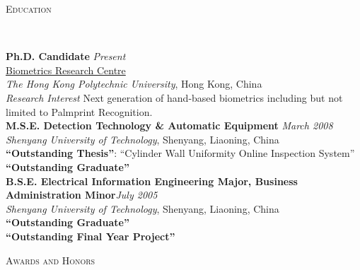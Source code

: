 \documentclass[9pt]{article}
\newenvironment{changemargin}[2]{%
  \begin{list}{}{%
    \setlength{\topsep}{0pt}%
    \setlength{\leftmargin}{#1}%
    \setlength{\rightmargin}{#2}%
    \setlength{\listparindent}{\parindent}%
    \setlength{\itemindent}{\parindent}%
    \setlength{\parsep}{\parskip}%
  }%
  \item[]}{\end{list}
}
\newcommand{\lineover}{
	\begin{changemargin}{-0.05in}{-0.05in}
		\vspace*{-8pt}
		\hrulefill \\
		\vspace*{-2pt}
	\end{changemargin}
}
\newcommand{\header}[1]{
	\begin{changemargin}{-0.5in}{-0.5in}
		\scshape{#1}\\
  	\lineover
	\end{changemargin}
}
\newenvironment{body} {
	\vspace*{-16pt}
	\begin{changemargin}{-0.25in}{-0.5in}
  }	
	{\end{changemargin}
}
\begin{document}
\medskip


\header{Education}

\begin{body}
	\vspace{14pt}
	\textbf{Ph.D. Candidate}{} \hfill \emph{Present}{} \\
    \href{http://www.comp.polyu.edu.hk/~biometrics/}{Biometrics Research Centre}\\
	\emph{The Hong Kong Polytechnic University}, Hong Kong, China{} \\
    \emph{Research Interest}{} {Next generation of hand-based biometrics including but not limited to Palmprint Recognition.}{}\\
  \medskip
	\textbf{M.S.E. Detection Technology \& Automatic Equipment}{} \hfill \emph{March 2008}{}\\
	\emph{Shenyang University of Technology}, Shenyang, Liaoning, China{} \\
	\textbf{``Outstanding Thesis''}: ``Cylinder Wall Uniformity Online Inspection System''\\
    \textbf{``Outstanding Graduate''}\\
  \medskip
	\textbf{B.S.E. Electrical Information Engineering Major, Business Administration Minor}\hfill \emph{July 2005} \\
    \emph{Shenyang University of Technology}, Shenyang, Liaoning, China{} \\
    \textbf{``Outstanding Graduate''}\\
    \textbf{``Outstanding Final Year Project''}\\
\end{body}

\medskip


\header{Awards and Honors}
\end{document}
